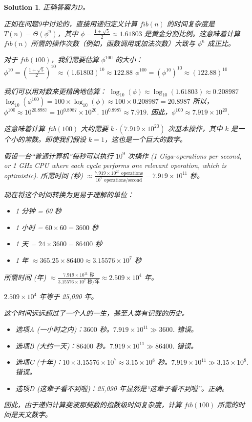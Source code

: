 \documentclass[UTF8]{report}
\newtheorem{solution}{Solution}
\theoremstyle{MyLineTheoremStyle} %
\theoremstyle{MyBlockTheoremStyle} %
\theoremstyle{MySubsubsectionStyle} %
\begin{document}
\begin{solution}
正确答案为D。

正如在问题9中讨论的，直接用递归定义计算 $fib(n)$ 的时间复杂度是 $T(n) = \Theta(\phi^n)$，其中 $\phi = \frac{1+\sqrt{5}}{2} \approx 1.61803$ 是黄金分割比例。这意味着计算 $fib(n)$ 所需的操作次数（例如，函数调用或加法次数）大致与 $\phi^n$ 成正比。

对于 $fib(100)$，我们需要估算 $\phi^{100}$ 的大小：
$\phi^{10} = (\frac{1+\sqrt{5}}{2})^{10} \approx (1.61803)^{10} \approx 122.88$
$\phi^{100} = (\phi^{10})^{10} \approx (122.88)^{10}$

我们可以用对数来更精确地估算：
$\log_{10}(\phi) \approx \log_{10}(1.61803) \approx 0.208987$
$\log_{10}(\phi^{100}) = 100 \times \log_{10}(\phi) \approx 100 \times 0.208987 = 20.8987$
所以，$\phi^{100} \approx 10^{20.8987} = 10^{0.8987} \times 10^{20}$.
$10^{0.8987} \approx 7.919$.
因此，$\phi^{100} \approx 7.919 \times 10^{20}$.

这意味着计算 $fib(100)$ 大约需要 $k \cdot (7.919 \times 10^{20})$ 次基本操作，其中 $k$ 是一个小的常数。即使我们假设 $k=1$，这也是一个巨大的数字。

假设一台“普通计算机”每秒可以执行 $10^9$ 次操作 (1 Giga-operations per second, or 1 GHz CPU where each cycle performs one relevant operation, which is optimistic).
所需时间 (秒) $\approx \frac{7.919 \times 10^{20} \text{ operations}}{10^9 \text{ operations/second}} = 7.919 \times 10^{11}$ 秒。

现在将这个时间转换为更易于理解的单位：
\begin{itemize}
    \item 1 分钟 = 60 秒
    \item 1 小时 = $60 \times 60 = 3600$ 秒
    \item 1 天 = $24 \times 3600 = 86400$ 秒
    \item 1 年 $\approx 365.25 \times 86400 \approx 3.15576 \times 10^7$ 秒
\end{itemize}
所需时间 (年) $\approx \frac{7.919 \times 10^{11} \text{ 秒}}{3.15576 \times 10^7 \text{ 秒/年}} \approx 2.509 \times 10^4$ 年。

$2.509 \times 10^4$ 年等于 25,090 年。

这个时间远远超过了一个人的一生，甚至人类有记载的历史。
\begin{itemize}
    \item 选项A (一小时之内)：$3600$ 秒。$7.919 \times 10^{11} \gg 3600$. 错误。
    \item 选项B (大约一天)：$86400$ 秒。$7.919 \times 10^{11} \gg 86400$. 错误。
    \item 选项C (十年)：$10 \times 3.15576 \times 10^7 \approx 3.15 \times 10^8$ 秒。$7.919 \times 10^{11} \gg 3.15 \times 10^8$. 错误。
    \item 选项D (这辈子看不到啦)：25,090 年显然是“这辈子看不到啦”。正确。
\end{itemize}
因此，由于递归计算斐波那契数的指数级时间复杂度，计算 $fib(100)$ 所需的时间是天文数字。
\end{solution}
\end{document}

